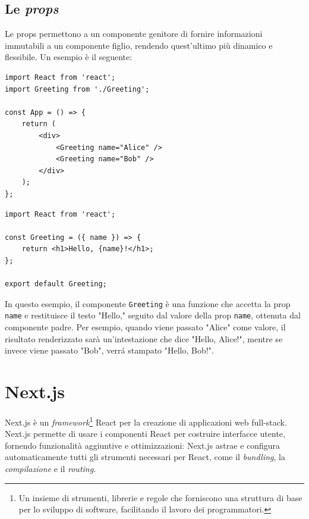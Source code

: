 \documentclass[target=bach,aauheader=,style=]{thud}
\begin{document}
\subsection{Le \textit{props}}
Le props permettono a un componente genitore di fornire informazioni immutabili a un componente figlio, rendendo quest'ultimo più dinamico e flessibile. Un esempio è il seguente:

\begin{minipage}[t]{0.45\textwidth}
    \begin{lstlisting}[caption=Componente genitore]
import React from 'react';
import Greeting from './Greeting';

const App = () => {
    return (
        <div>
            <Greeting name="Alice" />
            <Greeting name="Bob" />
        </div>
    );
};  
    \end{lstlisting}
\end{minipage}
\hfill
\begin{minipage}[t]{0.45\textwidth}
    \begin{lstlisting}[caption=Componente figlio]
import React from 'react';

const Greeting = ({ name }) => {
    return <h1>Hello, {name}!</h1>;
};

export default Greeting;
    \end{lstlisting}
\end{minipage}

In questo esempio, il componente \texttt{Greeting} è una funzione che accetta la prop \texttt{name} e restituisce il testo  "Hello," seguito dal valore della prop \texttt{name}, ottenuta dal componente padre. Per esempio, quando viene passato "Alice" come valore, il risultato renderizzato sarà un'intestazione che dice "Hello, Alice!", mentre se invece viene passato "Bob", verrá stampato "Hello, Bob!".

\section{Next.js}
Next.js \cite{nextjsdocs2024} è un \textit{framework}\footnote{Un insieme di strumenti, librerie e regole che forniscono una struttura di base per lo sviluppo di software, facilitando il lavoro dei programmatori.} React per la creazione di applicazioni web full-stack. Next.js permette di usare i componenti React per costruire interfacce utente, fornendo funzionalità aggiuntive e ottimizzazioni: Next.js astrae e configura automaticamente tutti gli strumenti necessari per React, come il \textit{bundling}, la \textit{compilazione} e il \textit{routing}.
\end{document}
